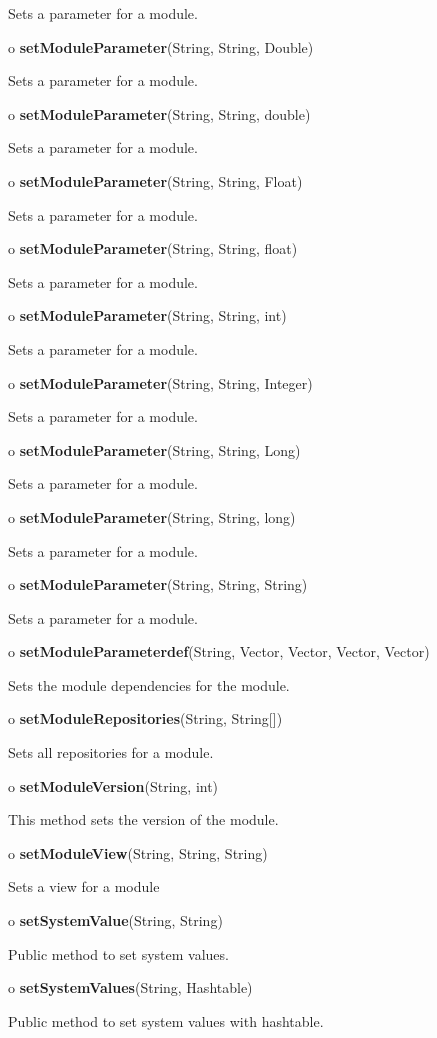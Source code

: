\begin{description}
Sets a parameter for a module.  
\item o {\bf setModuleParameter}(String, String, Double)  

Sets a parameter for a module.  
\item o {\bf setModuleParameter}(String, String, double)  

Sets a parameter for a module.  
\item o {\bf setModuleParameter}(String, String, Float)  

Sets a parameter for a module.  
\item o {\bf setModuleParameter}(String, String, float)  

Sets a parameter for a module.  
\item o {\bf setModuleParameter}(String, String, int)  

Sets a parameter for a module.  
\item o {\bf setModuleParameter}(String, String, Integer)  

Sets a parameter for a module.  
\item o {\bf setModuleParameter}(String, String, Long)  

Sets a parameter for a module.  
\item o {\bf setModuleParameter}(String, String, long)  

Sets a parameter for a module.  
\item o {\bf setModuleParameter}(String, String, String)  

Sets a parameter for a module.  
\item o {\bf setModuleParameterdef}(String, Vector, Vector, Vector, Vector)  

Sets the module dependencies for the module.  
\item o {\bf setModuleRepositories}(String, String[])  

Sets all repositories for a module.  
\item o {\bf setModuleVersion}(String, int)  

This method sets the version of the module.  
\item o {\bf setModuleView}(String, String, String)  

Sets a view for a module  
\item o {\bf setSystemValue}(String, String)  

Public method to set system values.  
\item o {\bf setSystemValues}(String, Hashtable)  

Public method to set system values with hashtable. 
\end{description}

